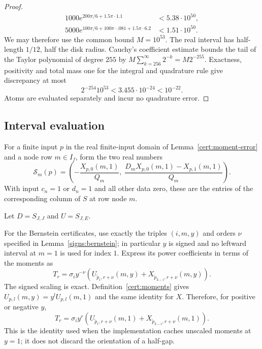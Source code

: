 \begin{proof}
\[\begin{aligned}
 1000e^{200\pi/6+1.5\pi\cdot1.1}&<5.38\cdot10^{50},\\
 5000e^{100\pi/6+100\pi\cdot.081+1.5\pi\cdot6.2}
       &<1.51\cdot10^{50}.
\end{aligned}
\]
We may therefore use the common bound $M=10^{53}$.
The real interval has half-length $1/12$, half the disk radius.
Cauchy's coefficient estimate bounds the tail of the Taylor polynomial
of degree $255$ by $M\sum_{k=256}^{\infty}2^{-k}=M2^{-255}$.
Exactness, positivity and total mass one for the integral and quadrature
rule give discrepancy at most
\begin{equation}\label{cert:quadrature-error}
 2^{-254}10^{53}<3.455\cdot10^{-24}<10^{-22}.
\end{equation}
Atoms are evaluated separately and incur no quadrature error.
\end{proof}

\subsection{Interval evaluation}\label{cert:evaluation}

For a finite input $p$ in the real finite-input domain of
Lemma~\ref{cert:moment-error} and a node row $m\in I_f$, form the two real numbers
\begin{equation}\label{cert:pair}
 \mathcal S_m(p)=
 \left(-\frac{X_{p,0}(m,1)}{Q_m},\;
 \frac{D_mX_{p,0}(m,1)-X_{p,1}(m,1)}{Q_m}\right).
\end{equation}
With input $c_n=1$ or $d_n=1$ and all other data zero, these are the
entries of the corresponding column of $S$ at row node $m$.

Let $D=S_{J,J}$ and $U=S_{J,E}$.

For the Bernstein certificates, use exactly the triples $(i,m,y)$ and
orders $\nu$ specified in Lemma~\ref{signs:bernstein}; in particular $y$
is signed and no leftward interval at $m=1$ is used for index $1$.
Express its power coefficients in terms of the moments as
\begin{equation}\label{cert:power-from-moments}
 T_r=\sigma_i y^{-\nu}
 \left(U_{\widetilde p_i,r+\nu}(m,y)
             +X_{\widetilde p_{3-i},r+\nu}(m,y)\right).
\end{equation}
The signed scaling is exact.  Definition~\eqref{cert:moments} gives
$U_{p,l}(m,y)=y^lU_{p,l}(m,1)$ and the same identity for $X$.
Therefore, for positive or negative $y$,
\[
 T_r=\sigma_i y^r\left(U_{\widetilde p_i,r+\nu}(m,1)
                 +X_{\widetilde p_{3-i},r+\nu}(m,1)\right).
\]
This is the identity used when the implementation caches unscaled moments
at $y=1$; it does not discard the orientation of a half-gap.

